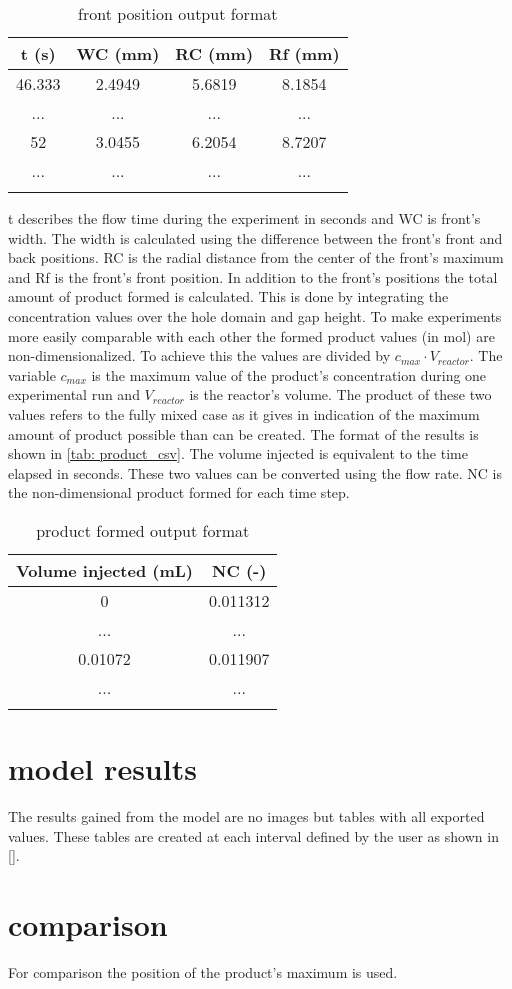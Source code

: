 \documentclass[../thesis.tex]{subfiles}
\begin{document}
\begin{table} [htb]
	\centering
	\caption{front position output format}
	\begin{tabular}{ cccc }
		\hline
		t (s) & WC (mm) & RC (mm) & Rf (mm) \\
		\hline
		46.333 & 2.4949 & 5.6819 & 8.1854 \\
		... & ... & ... & ... \\
		52 & 3.0455 & 6.2054 & 8.7207 \\
		... & ... & ... & ... \\
		\hline
		\label{tab: front_csv}
	\end{tabular}
\end{table}
t describes the flow time during the experiment in seconds and WC is front's width. The width is calculated using the difference between the front's front and back positions. RC is the radial distance from the center of the front's maximum and Rf is the front's front position.
In addition to the front's positions the total amount of product formed is calculated. This is done by integrating the concentration values over the hole domain and gap height. To make experiments more easily comparable with each other the formed product values (in mol) are non-dimensionalized. To achieve this the values are divided by $c_{max} \cdot V_{reactor}$. The variable $c_{max}$ is the maximum value of the product's concentration during one experimental run and $V_{reactor}$ is the reactor's volume. The product of these two values refers to the fully mixed case as it gives in indication of the maximum amount of product possible than can be created. The format of the results is shown in \autoref{tab: product_csv}. The volume injected is equivalent to the time elapsed in seconds. These two values can be converted using the flow rate. NC is the non-dimensional product formed for each time step.

\begin{table} [htb]
	\centering
	\caption{product formed output format}
	\begin{tabular}{ cc }
		\hline
		Volume injected (mL) & NC (-) \\
		\hline
		0 & 0.011312 \\
		... & ... \\
		0.01072 & 0.011907 \\
		... & ... \\
		\hline
		\label{tab: product_csv}
	\end{tabular}
\end{table}

\section{model results}
\label{sec: model res}

The results gained from the model are no images but tables with all exported values. These tables are created at each interval defined by the user as shown in \autoref{}.

\section{comparison}

For comparison the position of the product's maximum is used.
\end{document}
